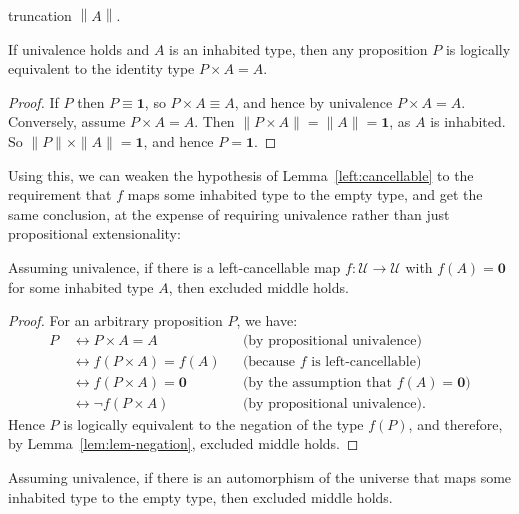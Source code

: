 \documentclass[a4paper,UKenglish]{lipics-v2016}
\newcommand{\UU}{\mathcal{U}}
\newcommand{\Empty}{\mathbf{0}}
\newcommand{\unit}{\mathbf{1}}
\begin{document}
truncation $\left\| A \right\|$.
\begin{lemma}\label{lem:prop-equivalent}
  If univalence holds and $A$ is an inhabited type, then any
  proposition $P$ is logically equivalent to the identity type
  $P \times A = A$.
\end{lemma}
\begin{proof}
  If $P$ then $P \equiv \unit$, so $P \times A \equiv A$,
  and hence by univalence $P \times A = A$.  Conversely, assume $P \times A = A$.
  Then $\|P \times A\| = \|A\| = \unit$, as $A$ is inhabited.  So
  $\|P\|\times\|A\|=\unit$, and hence $P=\unit$.
\end{proof}
Using this, we can weaken the hypothesis of Lemma~\ref{left:cancellable} to the requirement that $f$
maps some inhabited type to the empty type, and get the same
conclusion, at the expense of
requiring univalence rather than just propositional extensionality:
\begin{lemma} \label{left:cancellable:bis} Assuming univalence, if
  there is a left-cancellable map $f: \UU \to \UU$ with
  $f(A)=\Empty$ for some inhabited type $A$, then excluded middle holds.
\end{lemma}
\begin{proof}
  For an arbitrary proposition $P$, we have:
  \begin{align*}
    P \,\!& \leftrightarrow  P \times A = A \quad
    && \mbox{(by propositional univalence)}
    \\
        &\leftrightarrow  f(P \times A)=f(A)
    && \mbox{(because $f$ is left-cancellable)}
    \\
        &\leftrightarrow f(P \times A)=\Empty
    && \mbox{(by the assumption that $f(A)=\Empty$)}
    \\
        &\leftrightarrow \neg f(P \times A)
          && \mbox{(by propositional univalence).}
  \end{align*}
  Hence $P$ is logically equivalent to the negation of the type
  $f(P)$, and therefore, by Lemma~\ref{lem:lem-negation}, excluded
  middle holds.
\end{proof}
\begin{theorem}
\label{thm:automorphism:bis}
Assuming univalence, if there is an automorphism of the universe that
maps some inhabited type to the empty type, then excluded middle
holds.
\end{theorem}
\end{document}
